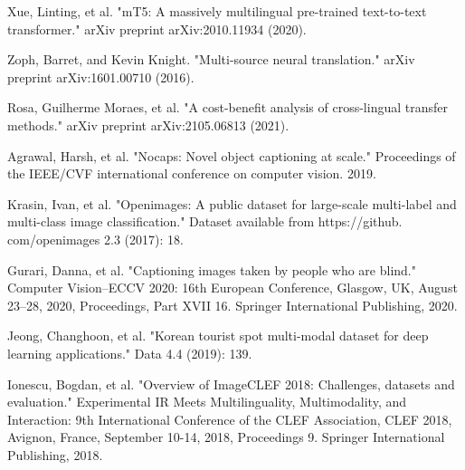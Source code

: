 \documentclass[runningheads]{llncs}
\begin{document}
\begin{thebibliography}{8}
Xue, Linting, et al. "mT5: A massively multilingual pre-trained text-to-text transformer." arXiv preprint arXiv:2010.11934 (2020).

Zoph, Barret, and Kevin Knight. "Multi-source neural translation." arXiv preprint arXiv:1601.00710 (2016).

Rosa, Guilherme Moraes, et al. "A cost-benefit analysis of cross-lingual transfer methods." arXiv preprint arXiv:2105.06813 (2021).

Agrawal, Harsh, et al. "Nocaps: Novel object captioning at scale." Proceedings of the IEEE/CVF international conference on computer vision. 2019.

Krasin, Ivan, et al. "Openimages: A public dataset for large-scale multi-label and multi-class image classification." Dataset available from https://github. com/openimages 2.3 (2017): 18.

Gurari, Danna, et al. "Captioning images taken by people who are blind." Computer Vision–ECCV 2020: 16th European Conference, Glasgow, UK, August 23–28, 2020, Proceedings, Part XVII 16. Springer International Publishing, 2020.

Jeong, Changhoon, et al. "Korean tourist spot multi-modal dataset for deep learning applications." Data 4.4 (2019): 139.

Ionescu, Bogdan, et al. "Overview of ImageCLEF 2018: Challenges, datasets and evaluation." Experimental IR Meets Multilinguality, Multimodality, and Interaction: 9th International Conference of the CLEF Association, CLEF 2018, Avignon, France, September 10-14, 2018, Proceedings 9. Springer International Publishing, 2018.

\end{thebibliography}
\end{document}
